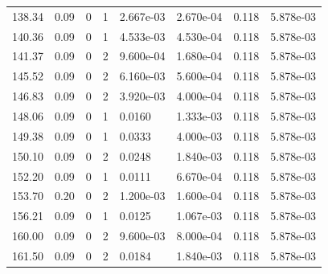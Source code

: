 \documentclass[preview]{standalone}
\begin{document}
{{{\begin{tabular}{L{1.2cm}C{1.2cm} C{0.3cm}C{0.5cm} C{1.4cm}C{1.4cm} C{1.4cm}C{1.4cm}}
  138.34  &  0.09  & 0     &  1 &  2.667e-03  & 2.670e-04  & 0.118 &  5.878e-03   \\ 
  140.36  &  0.09  & 0     &  1 &  4.533e-03  & 4.530e-04  & 0.118 &  5.878e-03   \\ 
  141.37  &  0.09  & 0     &  2 &  9.600e-04  & 1.680e-04  & 0.118 &  5.878e-03   \\ 
  145.52  &  0.09  & 0     &  2 &  6.160e-03  & 5.600e-04  & 0.118 &  5.878e-03   \\ 
  146.83  &  0.09  & 0     &  2 &  3.920e-03  & 4.000e-04  & 0.118 &  5.878e-03   \\ 
  148.06  &  0.09  & 0     &  1 &  0.0160  & 1.333e-03  & 0.118 &  5.878e-03   \\ 
  149.38  &  0.09  & 0     &  1 &  0.0333  & 4.000e-03  & 0.118 &  5.878e-03   \\ 
  150.10  &  0.09  & 0     &  2 &  0.0248  & 1.840e-03  & 0.118 &  5.878e-03   \\ 
  152.20  &  0.09  & 0     &  1 &  0.0111  & 6.670e-04  & 0.118 &  5.878e-03   \\ 
  153.70  &  0.20  & 0     &  2 &  1.200e-03  & 1.600e-04  & 0.118 &  5.878e-03   \\ 
  156.21  &  0.09  & 0     &  1 &  0.0125  & 1.067e-03  & 0.118 &  5.878e-03   \\ 
  160.00  &  0.09  & 0     &  2 &  9.600e-03  & 8.000e-04  & 0.118 &  5.878e-03   \\ 
  161.50  &  0.09  & 0     &  2 &  0.0184  & 1.840e-03  & 0.118 &  5.878e-03   \\ 
\hline 
\end{tabular} 

}}}
\end{document}
